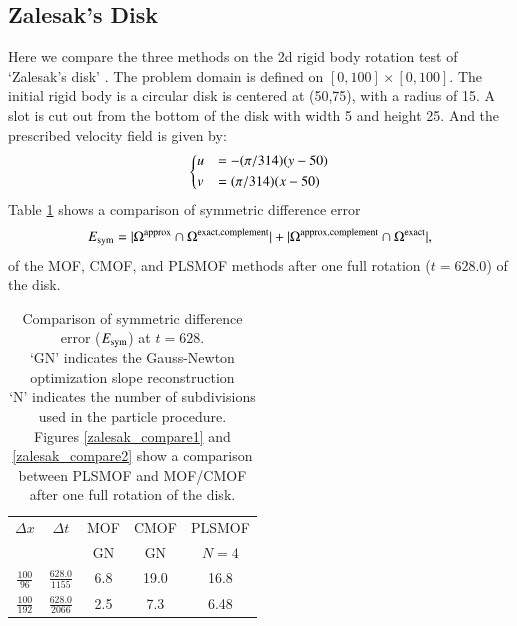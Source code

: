 \documentclass[preprint,12pt]{Definitions/elsarticle}
\newcommand{\tn}{\textnormal}
\begin{document}
\subsection{Zalesak's Disk}
Here we compare the three methods on the 2d rigid body rotation test of `Zalesak's disk' \cite{zalesak1979fully}. The problem domain is defined on $[0,100]\times[0,100]$. The initial rigid body is a circular disk is centered at (50,75), with a radius of 15. A slot is cut out from the bottom of the disk with width 5 and height 25. And the prescribed velocity field is given by:
\begin{equation*}
\begin{dcases}
u&=-(\pi/314)(y-50)\\
v&=(\pi/314)(x-50)
\end{dcases}
\end{equation*}
\newline
Table \ref{zalesaktable} shows a comparison of symmetric difference
error
\begin{eqnarray}
E_\tn{sym}=
|\Omega^\tn{approx}\cap\Omega^\tn{exact,complement}|+
|\Omega^\tn{approx,complement}\cap\Omega^\tn{exact}|,
\label{symmetricdiff}
\end{eqnarray}
of the MOF, CMOF, and PLSMOF methods after one full rotation ($t=628.0$) of the disk.

\begin{table}[H]
	\centering	
	\caption{Comparison of symmetric difference error ($E_\tn{sym}$) at $t=628$.\\
		`GN' indicates the Gauss-Newton optimization slope reconstruction \\
		`N' indicates the number of subdivisions used in the particle procedure.\\
		Figures \ref{zalesak_compare1} and \ref{zalesak_compare2} show a comparison between PLSMOF and MOF/CMOF after one full rotation of the disk. }
	\renewcommand{\arraystretch}{1.2} %
	\begin{tabular}{|c|c|c|c|c|}
		\hline
		$\Delta x$ & $\Delta t$ & MOF   & CMOF  & PLSMOF\\ 
		& & GN & GN  & $N = 4$
		\\ \hline 
		$\frac{100}{96}$ & $\frac{628.0}{1155}$ & 6.8  & 19.0  & 16.8
		\\ \hline
		$\frac{100}{192}$ & $\frac{628.0}{2066}$ & 2.5  & 7.3   & 6.48
		\\ \hline
	\end{tabular}  
	\label{zalesaktable}	
\end{table}
\end{document}
